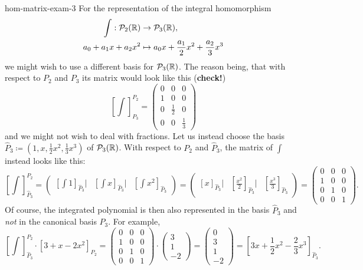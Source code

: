 \begin{example}{}{hom-matrix-exam-3}
 For the representation of the integral homomorphism
 \begin{align*}
  \int : \mathcal{P}_2(\mathbb{R}) & \to \mathcal{P}_3(\mathbb{R}),\\
  a_0 + a_1x + a_2x^2 & \mapsto a_0x + \frac{a_1}{2}x^2 + \frac{a_2}{3}x^3
 \end{align*}
 we might wish to use a different basis for $\mathcal{P}_3(\mathbb{R})$. The reason
 being, that with respect to $P_2$ and $P_3$ its matrix would look like this
 (\textbf{check!})
 \[
  \left[\int \right]_{P_3}^{P_2} = 
  \begin{pmatrix}
    0 & 0 & 0\\
    1 & 0 & 0\\
    0 & \frac{1}{2} & 0\\
    0 & 0 & \frac{1}{3}
  \end{pmatrix}
 \]
 and we might not wish to deal with fractions. Let us instead choose the basis
 $\hat{P}_3 \coloneqq (1, x, \frac{1}{2}x^2, \frac{1}{3}x^3)$ of
 $\mathcal{P}_3(\mathbb{R})$. With respect to $P_2$ and $\hat{P}_3$, the matrix of $\int
 $ instead looks like this:
 \[
  \left[ \int  \right]_{\hat{P}_3}^{P_2} = 
  \begin{pmatrix}
   \left[ \int 1 \right]_{\hat{P}_3} \mathrel{\big|} &
   \left[ \int x \right]_{\hat{P}_3} \mathrel{\big|} &
   \left[ \int x^2 \right]_{\hat{P}_3}
  \end{pmatrix} = 
  \begin{pmatrix}
   [x]_{\hat{P}_3} \mathrel{\big|} & \left[ \frac{x^2}{2} \right]_{\hat{P}_3}
   \mathrel{\big|} & \left[ \frac{x^3}{3} \right]_{\hat{P}_3}
  \end{pmatrix} =
  \begin{pmatrix}
   0 & 0 & 0\\
   1 & 0 & 0\\
   0 & 1 & 0\\
   0 & 0 & 1
  \end{pmatrix}.
 \]
 Of course, the integrated polynomial is then also represented in the basis
 $\hat{P}_3$ and \emph{not} in the canonical basis $P_3$. For example,
 \[
  \left[ \int \right]_{\hat{P}_3}^{P_2} \cdot [3 + x - 2x^2]_{P_2} =
  \begin{pmatrix}
   0 & 0 & 0\\
   1 & 0 & 0\\
   0 & 1 & 0\\
   0 & 0 & 1
  \end{pmatrix} \cdot 
  \begin{pmatrix}
   3\\
   1\\
   -2
  \end{pmatrix}
  =
  \begin{pmatrix}
   0\\
   3\\
   1\\
   -2
  \end{pmatrix}
  = \left[3x + \frac{1}{2}x^2 - \frac{2}{3}x^3\right]_{\hat{P}_3}.
 \]
\end{example}

